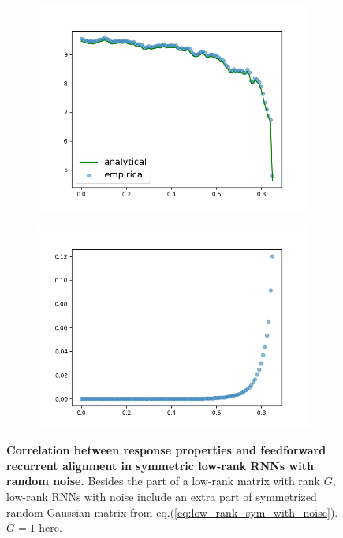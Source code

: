 \documentclass[11pt]{article}
\begin{document}
\begin{figure}[H]
\begin{subfigure}[b]{0.45\textwidth}
				\caption{}
			\end{subfigure}
			\newline
			\begin{subfigure}[b]{0.45\textwidth}
				\centering
				\includegraphics[width=\textwidth]{../figures/dim_low_rank_sym_with_noise.png}
				\caption{}
			\end{subfigure}
			\hfill
			\begin{subfigure}[b]{0.45\textwidth}
				\centering
				\includegraphics[width=\textwidth]{../figures/spont_align_low_rank_sym_with_noise.png}
				\caption{}
			\end{subfigure}
		\caption{\textbf{Correlation between response properties and feedforward recurrent alignment in symmetric low-rank RNNs with random noise.} Besides the part of a low-rank matrix with rank $G$, low-rank RNNs with noise include an extra part of symmetrized random Gaussian matrix from eq.(\ref{eq:low_rank_sym_with_noise}). $G=1$ here.\\
}
\end{figure}
\end{document}
